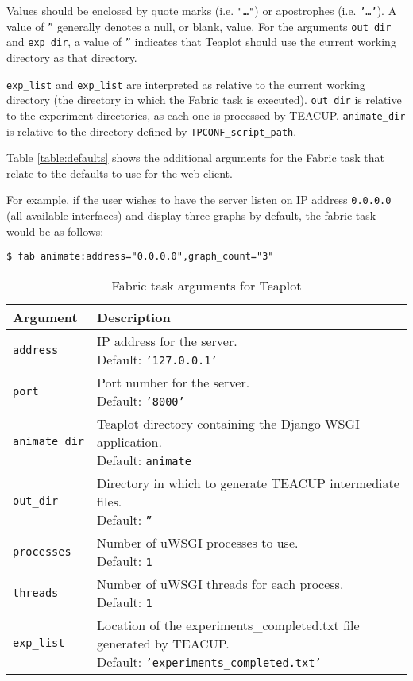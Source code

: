 \documentclass[a4paper,twocolumn,english,11pt, a4paper, conference]{IEEEtran}
\newcommand{\sh}[2]{{\small \texttt{#1 #2}}}
\begin{document}
Values should be enclosed by quote marks (i.e. \texttt{"…"}) or apostrophes (i.e. \texttt{'…'}). A value of \texttt{''} generally denotes a null, or blank, value. For the arguments \texttt{out\_dir} and \texttt{exp\_dir}, a value of \texttt{''} indicates that Teaplot should use the current working directory as that directory.

\texttt{exp\_list} and \texttt{exp\_list} are interpreted as relative to the current working directory (the directory in which the Fabric task is executed). \texttt{out\_dir} is relative to the experiment directories, as each one is processed by TEACUP. \texttt{animate\_dir} is relative to the directory defined by \texttt{TPCONF\_script\_path}.

Table \ref{table:defaults} shows the additional arguments for the Fabric task that relate to the defaults to use for the web client. 

For example, if the user wishes to have the server listen on IP address \texttt{0.0.0.0} (all available interfaces) and display three graphs by default, the fabric task would be as follows:

\sh{\$}{fab animate:address="0.0.0.0",graph\_count="3"}



\begin{table}[t]
\centering
\caption{Fabric task arguments for Teaplot}
\label{table:args}
\small
\begin{tabular}{l  l}	
	\textbf{Argument} & \textbf{Description} \\ \toprule
	\texttt{address}      &  \pbox{5.5cm}{IP address for the server. \\ Default: \texttt{'127.0.0.1'}}  \\ \midrule 
	\texttt{port}          &  \pbox{5.5cm}{Port number for the server.  \\ Default: \texttt{'8000'}}  \\ \midrule 
	\texttt{animate\_dir} &    \pbox{5.5cm}{Teaplot directory containing the Django WSGI application.  \\ Default: \texttt{animate}} \\ \midrule 
	\texttt{out\_dir}      &  \pbox{5.5cm}{ Directory in which to generate TEACUP intermediate files.  \\ Default: \texttt{''}} \\ \midrule 
	\texttt{processes}    &  \pbox{5.5cm}{ Number of uWSGI processes to use.  \\ Default: \texttt{1}} \\ \midrule 
	\texttt{threads}       &  \pbox{5.5cm}{Number of uWSGI threads for each process.  \\ Default: \texttt{1}} \\ \midrule 
	\texttt{exp\_list}     &  \pbox{5.5cm}{ Location of the experiments\_completed.txt file generated by TEACUP.  \\ Default: \texttt{'experiments\_completed.txt'}}  \\ \bottomrule
\end{tabular}
\end{table}
\end{document}
